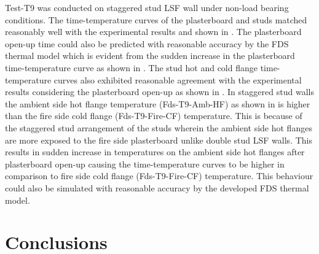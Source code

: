 Test-T9 was conducted on staggered stud LSF wall under non-load bearing conditions. The time-temperature curves of the plasterboard and studs matched reasonably well with the experimental results and shown in . The plasterboard open-up time could also be predicted with reasonable accuracy by the FDS thermal model which is evident from the sudden increase in the plasterboard time-temperature curve as shown in . The stud hot and cold flange time-temperature curves also exhibited reasonable agreement with the experimental results considering the plasterboard open-up as shown in . In staggered stud walls the ambient side hot flange temperature (Fds-T9-Amb-HF) as shown in  is higher than the fire side cold flange (Fds-T9-Fire-CF) temperature. This is because of the staggered stud arrangement of the studs wherein the ambient side hot flanges are more exposed to the fire side plasterboard unlike double stud LSF walls. This results in sudden increase in temperatures on the ambient side hot flanges after plasterboard open-up causing the time-temperature curves to be higher in comparison to fire side cold flange (Fds-T9-Fire-CF) temperature. This behaviour could also be simulated with reasonable accuracy by the developed FDS thermal model. 

\section{Conclusions}

